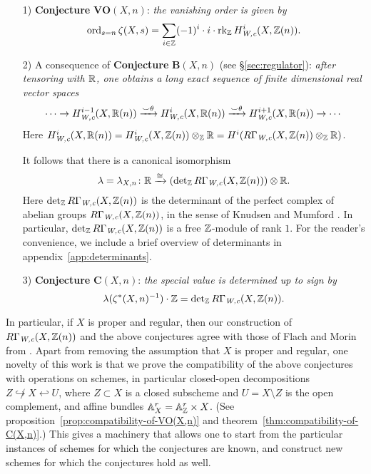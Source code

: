 \documentclass{article}
\numberwithin{equation}{section}
\begin{document}
\begin{enumerate}
\item[1)] \textbf{Conjecture} $\mathbf{VO} (X,n)$:
  \emph{the vanishing order is given by}
  \[ \operatorname{ord}_{s=n} \zeta (X,s) =
    \sum_{i\in \mathbb{Z}} (-1)^i \cdot i \cdot \operatorname{rk}_{\mathbb{Z}} H_{\text{\it W,c}}^i (X, \mathbb{Z}(n)). \]

\item[2)] A consequence of \textbf{Conjecture} $\mathbf{B} (X,n)$
  (see \S\ref{sec:regulator}):
  \emph{after tensoring with $\mathbb{R}$, one obtains a long exact sequence of finite
    dimensional real vector spaces}
  \[ \cdots \to H_{\text{\it W,c}}^{i-1} (X, \mathbb{R} (n)) \xrightarrow{\smile\theta}
    H_{\text{\it W,c}}^i (X, \mathbb{R} (n)) \xrightarrow{\smile\theta}
    H_{\text{\it W,c}}^{i+1} (X, \mathbb{R} (n)) \to \cdots \]
  Here
  $H_{\text{\it W,c}}^i (X, \mathbb{R} (n)) = H_{\text{\it W,c}}^i (X, \mathbb{Z} (n)) \otimes_{\mathbb{Z}} \mathbb{R} =
  H^i (R\Gamma_{\text{\it W,c}} (X, \mathbb{Z} (n)) \otimes_{\mathbb{Z}} \mathbb{R})$.

  It follows that there is a canonical isomorphism
  \[ \lambda = \lambda_{X,n}\colon \mathbb{R} \xrightarrow{\cong}
    (\operatorname{det}_{\mathbb{Z}} R\Gamma_{\text{\it W,c}} (X, \mathbb{Z} (n))) \otimes \mathbb{R}. \]
  Here $\operatorname{det}_{\mathbb{Z}} R\Gamma_{\text{\it W,c}} (X, \mathbb{Z} (n))$ is the determinant of the
  perfect complex of abelian groups $R\Gamma_{\text{\it W,c}} (X, \mathbb{Z} (n))$, in the sense of
  Knudsen and Mumford \cite{Knudsen-Mumford-1976}. In particular,
  $\operatorname{det}_{\mathbb{Z}} R\Gamma_{\text{\it W,c}} (X, \mathbb{Z} (n))$ is a free $\mathbb{Z}$-module of rank
  $1$. For the reader's convenience, we include a brief overview of determinants
  in appendix~\ref{app:determinants}.

\item[3)] \textbf{Conjecture} $\mathbf{C} (X,n)$:
  \emph{the special value is determined up to sign by}
  \[ \lambda (\zeta^* (X, n)^{-1}) \cdot \mathbb{Z} =
    \operatorname{det}_{\mathbb{Z}} R\Gamma_{\text{\it W,c}} (X, \mathbb{Z} (n)). \]
\end{enumerate}

In particular, if $X$ is proper and regular, then our construction of
$R\Gamma_{\text{\it W,c}} (X, \mathbb{Z} (n))$ and the above conjectures agree with those of Flach
and Morin from \cite{Flach-Morin-2018}. Apart from removing the assumption that
$X$ is proper and regular, one novelty of this work is that we prove the
compatibility of the above conjectures with operations on schemes, in particular
closed-open decompositions $Z \not\hookrightarrow X \hookleftarrow U$, where
$Z \subset X$ is a closed subscheme and $U = X\setminus Z$ is the open
complement, and affine bundles $\mathbb{A}_X^r = \mathbb{A}_{\mathbb{Z}}^r \times X$.
(See proposition~\ref{prop:compatibility-of-VO(X,n)} and
theorem~\ref{thm:compatibility-of-C(X,n)}.) This gives a machinery that allows
one to start from the particular instances of schemes for which the conjectures
are known, and construct new schemes for which the conjectures hold as well.
\end{document}
